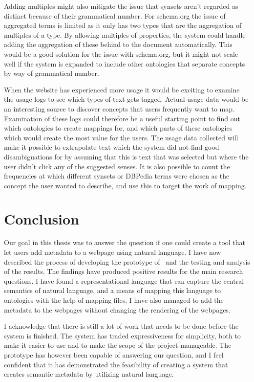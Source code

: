 Adding multiples might also mitigate the issue that synsets aren't regarded as distinct because of their grammatical number.
For schema.org the issue of aggregated terms is limited as it only has two types that are the aggregation of multiples of a type.
By allowing multiples of properties, the system could handle adding the aggregation of these behind to the document automatically.
This would be a good solution for the issue with schema.org,
but it might not scale well if the system is expanded to include other ontologies that separate concepts by way of grammatical number.

When the website has experienced more usage it would be exciting to examine the usage logs to see which types of text gets tagged.
Actual usage data would be an interesting source to discover concepts that users frequently want to map.
Examination of these logs could therefore be a useful starting point to find out which ontologies to create mappings for,
and which parts of these ontologies which would create the most value for the users.
The usage data collected will make it possible to extrapolate text which the system did not find good disambiguations for
by assuming that this is text that was selected but where the user didn't click any of the suggested senses.
It is also possible to count the frequencies at which different synsets or DBPedia terms were chosen as the concept the
user wanted to describe, and use this to target the work of mapping.

\section{Conclusion}
Our goal in this thesis was to answer the question if one could create a tool that let users add metadata to a webpage using
natural language.
I have now described the process of developing the prototype of \theartefact\ and the testing and analysis of the results.
The findings have produced positive results for the main research questions.
I have found a representational language that can capture the central semantics of natural language,
and a means of mapping this language to ontologies with the help of mapping files.
I have also managed to add the metadata to the webpages without changing the rendering of the webpages.

I acknowledge that there is still a lot of work that needs to be done before the system is finished.
The system has traded expressiveness for simplicity, both to make it easier to use and to make the scope of the project manageable.
The prototype has however been capable of answering our question,
and I feel confident that it has demonstrated the feasibility of creating a system that creates semantic metadata by
utilizing natural language.
